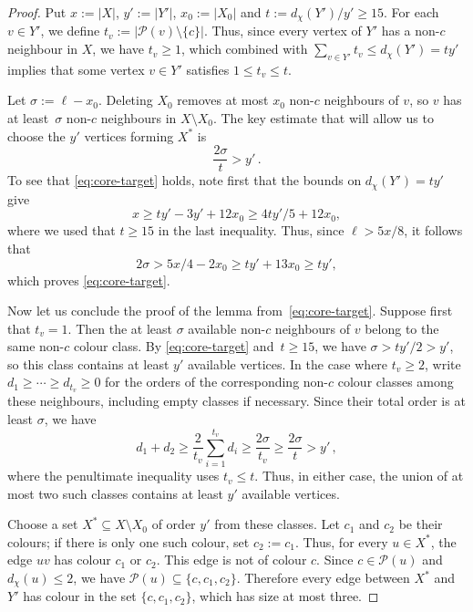 \documentclass[10pt,a4paper]{amsart}
\newcommand{\cP}{\mathcal P}
\newcommand{\dd}{d_{\chi}}
\begin{document}
\begin{proof}
Put $x:=|X|$, $y':=|Y'|$, $x_0:=|X_0|$ and $t:=\dd(Y')/y'\geq 15$. For each
$v\in Y'$, we define $t_v:=|\cP(v)\setminus\{c\}|$. Thus, since every vertex of
$Y'$ has a non-$c$ neighbour in $X$, we have $t_v\ge1$, which combined with
$\sum_{v\in Y'}t_v\le\dd(Y')=ty'$ implies that some vertex $v\in Y'$ satisfies
$1\le t_v\le t$.

Let $\sigma:=\ell-x_0$. Deleting $X_0$ removes at most $x_0$ non-$c$ neighbours
of $v$, so $v$ has at least~$\sigma$ non-$c$ neighbours in $X\setminus X_0$.
The key estimate that will allow us to choose the $y'$ vertices forming $X^*$
is
\begin{equation}\label{eq:core-target}
  \frac{2\sigma}{t}>y'\,.
\end{equation}
To see that \eqref{eq:core-target} holds, note first that the bounds on
$\dd(Y')=ty'$ give
$$
x\ge ty'-3y'+12x_0\ge 4ty'/5+12x_0,
$$
where we used that $t\geq 15$ in the last inequality. Thus, since
$\ell>5x/8$, it follows that
$$2\sigma>5x/4-2x_0\ge ty'+13x_0\ge ty',
$$
which proves \eqref{eq:core-target}.

Now let us conclude the proof of the lemma from~\eqref{eq:core-target}. Suppose
first that $t_v=1$. Then the at least $\sigma$ available non-$c$ neighbours
of $v$ belong to the same non-$c$ colour class. By \eqref{eq:core-target} and~$t\ge15$, we have $\sigma>ty'/2>y'$, so this class contains at least $y'$
available vertices. In the case where $t_v\ge2$, write
$d_1\ge\cdots\ge d_{t_v}\ge0$ for
the orders of the corresponding non-$c$ colour classes among these neighbours,
including empty classes if necessary. Since their total order is at least
$\sigma$, we have
\[
  d_1+d_2
  \ge\frac{2}{t_v}\sum_{i=1}^{t_v}d_i
  \ge\frac{2\sigma}{t_v}
  \ge\frac{2\sigma}{t}
  >y'\,,
\]
where the penultimate inequality uses $t_v\le t$. Thus, in either case, the
union of at most two such classes contains at least $y'$ available vertices.

Choose a set $X^*\subseteq X\setminus X_0$ of order $y'$ from these classes.
Let $c_1$ and $c_2$ be their colours; if there is only one such colour, set
$c_2:=c_1$. Thus, for every $u\in X^*$, the edge $uv$ has colour $c_1$ or
$c_2$. This edge is not of colour $c$. Since $c\in\cP(u)$ and
$\dd(u)\le2$, we have
$\cP(u)\subseteq\{c,c_1,c_2\}$. Therefore every edge between $X^*$ and $Y'$
has colour in the set $\{c,c_1,c_2\}$, which has size at most three.
\end{proof}
\end{document}

